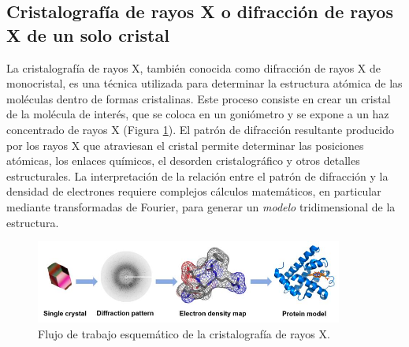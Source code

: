 \subsection{Cristalografía de rayos X o difracción de rayos X de un solo cristal}
La cristalografía de rayos X, también conocida como difracción de rayos X de monocristal, es una técnica utilizada para determinar la estructura atómica de las moléculas dentro de formas cristalinas. Este proceso consiste en crear un cristal de la molécula de interés, que se coloca en un goniómetro y se expone a un haz concentrado de rayos X (Figura \ref{fig:cristallography}). El patrón de difracción resultante producido por los rayos X que atraviesan el cristal permite determinar las posiciones atómicas, los enlaces químicos, el desorden cristalográfico y otros detalles estructurales. La interpretación de la relación entre el patrón de difracción y la densidad de electrones requiere complejos cálculos matemáticos, en particular mediante transformadas de Fourier, para generar un \textit{modelo} tridimensional de la estructura.

\begin{figure}[h]
\centering
\includegraphics[width = 0.9\textwidth]{figs/paste-F430F5B1.png}
\caption{Flujo de trabajo esquemático de la cristalografía de rayos X. }
\label{fig:cristallography}
\end{figure}

